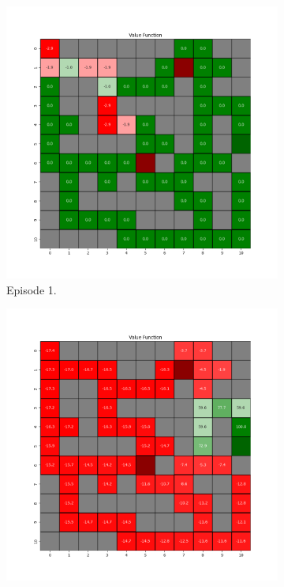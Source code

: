 \documentclass{assignment}
\begin{document}
\begin{figure}[H]
    \begin{subfigure}{0.3\textwidth}
        \includegraphics[width=\textwidth]{figures/value_q/alpha_sweep/value_function_alpha_1_gamma_0.95_epsilon_0.2_iteration_1.png}
    \caption{Episode 1.}
    \end{subfigure}\hfill
    \begin{subfigure}{0.3\textwidth}
        \includegraphics[width=\textwidth]{figures/value_q/alpha_sweep/value_function_alpha_1_gamma_0.95_epsilon_0.2_iteration_50.png}

\end{subfigure}
\end{figure}
\end{document}
